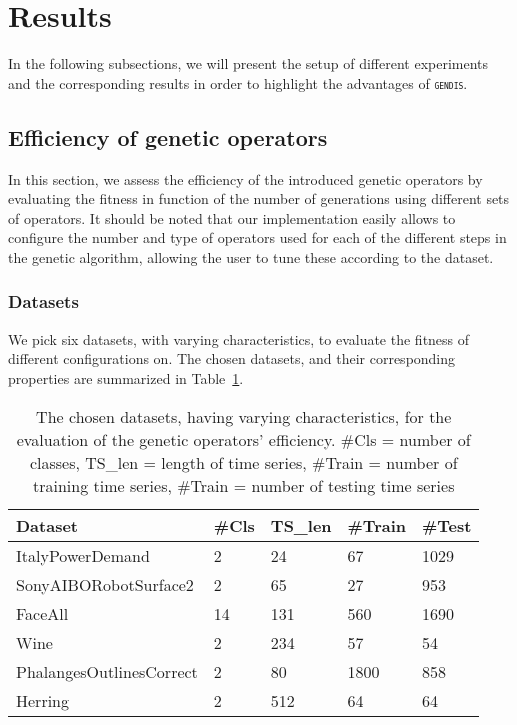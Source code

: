 \documentclass[runningheads]{llncs}
\begin{document}
\section{Results}\label{sec:results}

In the following subsections, we will present the setup of different experiments and the corresponding results in order to highlight the advantages of \textsc{\texttt{gendis}}.

\subsection{Efficiency of genetic operators}
In this section, we assess the efficiency of the introduced genetic operators by evaluating the fitness in function of the number of generations using different sets of operators. It should be noted that our implementation easily allows to configure the number and type of operators used for each of the different steps in the genetic algorithm, allowing the user to tune these according to the dataset.

\subsubsection{Datasets}
We pick six datasets, with varying characteristics, to evaluate the fitness of different configurations on. The chosen datasets, and their corresponding properties are summarized in Table~\ref{tab:datasets}.

\begin{table}[h!]
	\centering
	\scriptsize
	\begin{tabular}{lllll}
		\toprule
		Dataset  & \#Cls & TS\_len & \#Train & \#Test \\ \midrule
		ItalyPowerDemand          & 2         & 24        & 67      & 1029  \\
		SonyAIBORobotSurface2     & 2         & 65        & 27      & 953   \\
		FaceAll                   & 14        & 131       & 560     & 1690  \\
		Wine                      & 2         & 234       & 57      & 54  \\
		PhalangesOutlinesCorrect  & 2         & 80        & 1800    & 858  \\
		Herring                   & 2         & 512       & 64      & 64  \\ \bottomrule
	\end{tabular}
	\caption{The chosen datasets, having varying characteristics, for the evaluation of the genetic operators' efficiency. \#Cls = number of classes, TS\_len = length of time series, \#Train = number of training time series, \#Train = number of testing time series}
	\label{tab:datasets}
\end{table}
\end{document}
